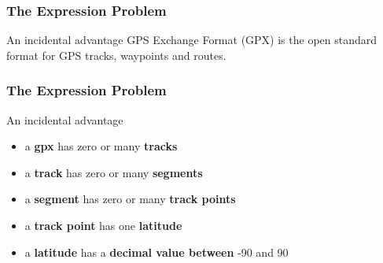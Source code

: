 \begin{frame}[fragile]
\frametitle{The Expression Problem}
\begin{block}{An incidental advantage}
GPS Exchange Format (GPX) is the open standard format for GPS tracks,
waypoints and routes.
\end{block}
\end{frame}

\begin{frame}[fragile]
\frametitle{The Expression Problem}
\begin{block}{An incidental advantage}
\begin{itemize}
\item a \textbf{gpx} has zero or many \textbf{tracks}
\item a \textbf{track} has zero or many \textbf{segments}
\item a \textbf{segment} has zero or many \textbf{track points}
\item a \textbf{track point} has one \textbf{latitude}
\item a \textbf{latitude} has a \textbf{decimal value between} -90 and 90
\end{itemize}
\end{block}
\end{frame}
